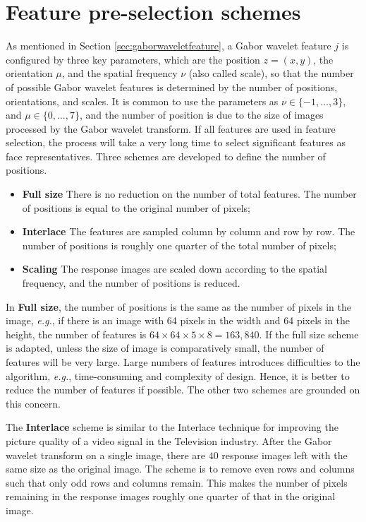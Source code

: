  
\section{Feature pre-selection schemes}
\label{sec:preselection}
As mentioned in \mbox{Section} \ref{sec:gaborwaveletfeature}, a Gabor wavelet feature $j$ is configured by three key parameters, which are the position $z=(x,y)$, the orientation $\mu$, and the spatial frequency $\nu$ (also called scale), so that the number of possible Gabor wavelet features is determined by the number of positions, orientations, and scales. It is common to use the parameters as $\nu\in\{-1,\ldots,3\}$, and $\mu\in\{0,\ldots,7\}$, and the number of position is due to the size of images processed by the Gabor wavelet transform. If all features are used in feature selection, the process will take a very long time to select significant features as face representatives. Three schemes are developed to define the number of positions.
\begin{itemize}
 \item \textbf{Full size} There is no reduction on the number of total features. The number of positions is equal to the original number of pixels;
 \item \textbf{Interlace} The features are sampled column by column and row by row. The number of positions is roughly one quarter of the total number of pixels;
 \item \textbf{Scaling} The response images are scaled down according to the spatial frequency, and the number of positions is reduced.
\end{itemize}

In \textbf{Full size}, the number of positions is the same as the number of pixels in the image, \textit{e.g.}, if there is an image with 64 pixels in the width and 64 pixels in the height, the number of features is $64\times 64 \times 5 \times 8 = 163,840$. If the full size scheme is adapted, unless the size of image is comparatively small, the number of features will be very large. Large numbers of features introduces difficulties to the algorithm, \textit{e.g.}, time-consuming and complexity of design. Hence, it is better to reduce the number of features if possible. The other two schemes are grounded on this concern.

The \textbf{Interlace} scheme is similar to the Interlace technique \cite{Ballard1939} for improving the picture quality of a video signal in the Television industry. After the Gabor wavelet transform on a single image, there are $40$ response images left with the same size as the original image. The scheme is to remove even rows and columns such that only odd rows and columns remain. This makes the number of pixels remaining in the response images roughly one quarter of that in the original image. 

